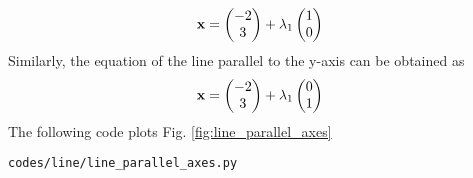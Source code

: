 \documentclass[journal,12pt,twocolumn]{IEEEtran}
\renewcommand\thesection{\arabic{section}}
\begin{document}
\begin{enumerate}[label=\thesection.\arabic*.,ref=\thesection.\theenumi]
\begin{align}
%
\label{eq:line_dir_vec}
\vec{x} = \myvec{-2\\3} + \lambda_1\myvec{1\\0}
\end{align}
%
Similarly, the equation of the line parallel to the y-axis can be obtained as
\begin{align}
\mathbf{x} = \begin{pmatrix}-2\\3\end{pmatrix} + \lambda_1\begin{pmatrix}0\\1\end{pmatrix}
\end{align}
%
The following code plots Fig. \ref{fig:line_parallel_axes}
%
\begin{lstlisting}
codes/line/line_parallel_axes.py
\end{lstlisting}
%


\end{enumerate}
\end{document}
